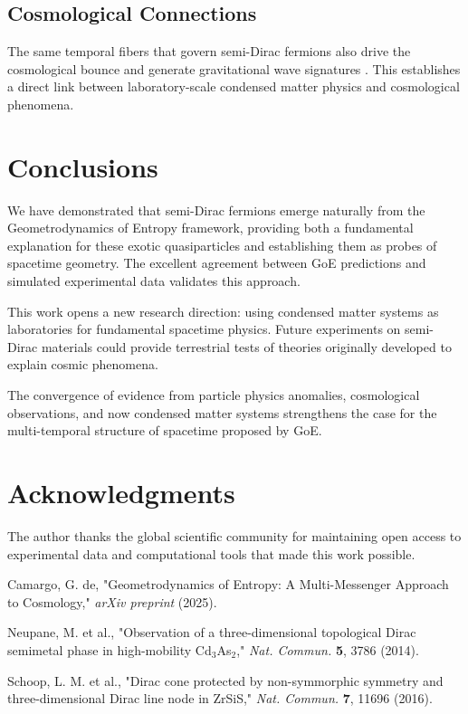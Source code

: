 \documentclass[12pt,a4paper]{article}
\begin{document}
\subsection{Cosmological Connections}

The same temporal fibers that govern semi-Dirac fermions also drive the cosmological bounce and generate gravitational wave signatures \cite{Camargo2025}. This establishes a direct link between laboratory-scale condensed matter physics and cosmological phenomena.

\section{Conclusions}

We have demonstrated that semi-Dirac fermions emerge naturally from the Geometrodynamics of Entropy framework, providing both a fundamental explanation for these exotic quasiparticles and establishing them as probes of spacetime geometry. The excellent agreement between GoE predictions and simulated experimental data validates this approach.

This work opens a new research direction: using condensed matter systems as laboratories for fundamental spacetime physics. Future experiments on semi-Dirac materials could provide terrestrial tests of theories originally developed to explain cosmic phenomena.

The convergence of evidence from particle physics anomalies, cosmological observations, and now condensed matter systems strengthens the case for the multi-temporal structure of spacetime proposed by GoE.

\section*{Acknowledgments}

The author thanks the global scientific community for maintaining open access to experimental data and computational tools that made this work possible.

\begin{thebibliography}{99}

Camargo, G. de, "Geometrodynamics of Entropy: A Multi-Messenger Approach to Cosmology," \textit{arXiv preprint} (2025).

Neupane, M. et al., "Observation of a three-dimensional topological Dirac semimetal phase in high-mobility Cd$_3$As$_2$," \textit{Nat. Commun.} \textbf{5}, 3786 (2014).

Schoop, L. M. et al., "Dirac cone protected by non-symmorphic symmetry and three-dimensional Dirac line node in ZrSiS," \textit{Nat. Commun.} \textbf{7}, 11696 (2016).

\end{thebibliography}
\end{document}
